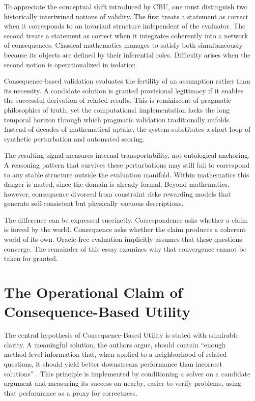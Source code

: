 \documentclass[12pt]{article}
\begin{document}
To appreciate the conceptual shift introduced by CBU, one must distinguish two historically intertwined notions of validity. The first treats a statement as correct when it corresponds to an invariant structure independent of the evaluator. The second treats a statement as correct when it integrates coherently into a network of consequences. Classical mathematics manages to satisfy both simultaneously because its objects are defined by their inferential roles. Difficulty arises when the second notion is operationalized in isolation.

Consequence-based validation evaluates the fertility of an assumption rather than its necessity. A candidate solution is granted provisional legitimacy if it enables the successful derivation of related results. This is reminiscent of pragmatic philosophies of truth, yet the computational implementation lacks the long temporal horizon through which pragmatic validation traditionally unfolds. Instead of decades of mathematical uptake, the system substitutes a short loop of synthetic perturbation and automated scoring.

The resulting signal measures internal transportability, not ontological anchoring. A reasoning pattern that survives these perturbations may still fail to correspond to any stable structure outside the evaluation manifold. Within mathematics this danger is muted, since the domain is already formal. Beyond mathematics, however, consequence divorced from constraint risks rewarding models that generate self-consistent but physically vacuous descriptions.

The difference can be expressed succinctly. Correspondence asks whether a claim is forced by the world. Consequence asks whether the claim produces a coherent world of its own. Oracle-free evaluation implicitly assumes that these questions converge. The remainder of this essay examines why that convergence cannot be taken for granted.

\section{The Operational Claim of Consequence-Based Utility}

The central hypothesis of Consequence-Based Utility is stated with admirable clarity. A meaningful solution, the authors argue, should contain ``enough method-level information that, when applied to a neighborhood of related questions, it should yield better downstream performance than incorrect solutions'' \citep{son2026}. This principle is implemented by conditioning a solver on a candidate argument and measuring its success on nearby, easier-to-verify problems, using that performance as a proxy for correctness.
\end{document}
